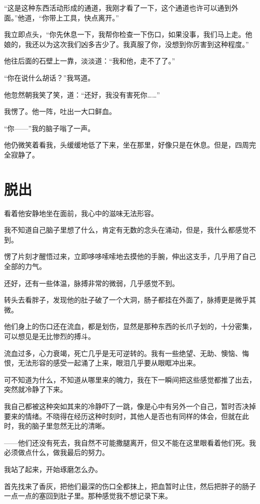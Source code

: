 “这是这种东西活动形成的通道，我刚才看了一下，这个通道也许可以通到外面。”他道，“你带上工具，快点离开。”

我立即点头，“你先休息一下，我帮你检查一下伤口，如果没事，我们马上走。他娘的，我还以为这次我们凶多吉少了。我真服了你，没想到你厉害到这种程度。”

他往后面的石壁上一靠，淡淡道：“我和他，走不了了。”

“你在说什么胡话？”我骂道。

他忽然朝我笑了笑，道：“还好，我没有害死你……”

我愣了。他一阵，吐出一大口鲜血。

“你——”我的脑子嗡了一声。

他仍微笑着看我，头缓缓地低了下来，坐在那里，好像只是在休息。但是，四周完全寂静了。

\chapter{脱出}

看着他安静地坐在面前，我心中的滋味无法形容。

我不知道自己脑子里想了什么，肯定有无数的念头在涌动，但是，我什么都感觉不到。

愣了片刻才醒悟过来，立即哆哆嗦嗦地去摸他的手腕，伸出这支手，几乎用了自己全部的力气。

还好，还有一些体温，脉搏非常的微弱，几乎感觉不到。

转头去看胖子，发现他的肚子破了一个大洞，肠子都挂在外面了，脉搏更是微乎其微。

他们身上的伤口还在流血，都是划伤，显然是那种东西的长爪子划的，十分密集，可以想见是无比惨烈的搏斗。

流血过多，心力衰竭，死亡几乎是无可逆转的。我有一些绝望、无助、懊恼、悔恨，无法形容的感受一起涌了上来，眼泪几乎要从眼眶冲出来。

可不知道为什么，不知道从哪里来的魄力，我在下一瞬间把这些感觉都推了出去，突然就冷静了下来。

我自己都被这种突如其来的冷静吓了一跳，像是心中有另外一个自己，暂时否决掉要来的情绪。不晓得在经历这种时刻时，其他人是否也有同样的体会，但就在此时，我的脑子里忽然无比的清晰。

——他们还没有死去，我自然不可能撒腿离开，但又不能在这里眼看着他们死。我必须做点什么，做我最后的努力。

我站了起来，开始琢磨怎么办。

首先找来了香灰，把他们最深的伤口全都抹上，把血暂时止住，然后把胖子的肠子一点一点的塞回到肚子里。那种感觉我不想记录下来。

